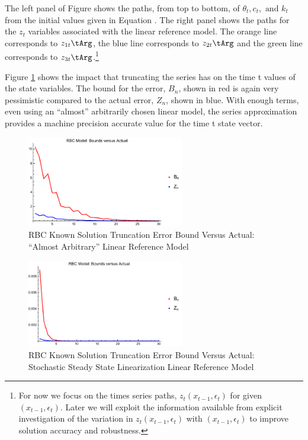 \documentclass[12pt]{article}
\begin{document}
The left panel of Figure  shows the paths, from top to bottom, of $\theta_t, c_t, \text{ and } k_t$ from the initial values given in Equation .  The right panel shows the paths for the $z_t$ variables associated with the linear reference model. The orange line corresponds to $z_{1t}\tArg$,
the blue line corresponds to $z_{2t}\tArg$ and the green line corresponds to $z_{3t}\tArg$.\footnote{For now we focus on the times series paths, $z_t(x_{t-1},\epsilon_t)$ for given $(x_{t-1},\epsilon_t)$.  Later we will exploit the information available from explicit investigation of the variation in
  $z_t(x_{t-1},\epsilon_t)$ with $(x_{t-1},\epsilon_t)$ to improve solution accuracy and robustness.}

Figure \ref{rbcTrunc} shows the impact that truncating the series has 
on the time t values of the state variables.   The bound for the error, $B_n$, shown in red 
 is again very pessimistic compared to the actual error, $Z_n$, shown in blue.
With enough terms, even using an ``almost'' arbitrarily chosen linear model,  the series approximation provides a machine precision accurate value for the time t state vector.  

\begin{figure}
  \centering
\includegraphics[width=2.7in]{simpArbBoundsVActual.pdf}  
  \caption{RBC Known Solution Truncation Error Bound Versus Actual: ``Almost Arbitrary'' Linear Reference Model}
  \label{rbcTrunc}
\end{figure}
\begin{figure}
  \centering
\includegraphics[width=2.7in]{simpBoundsVActual.pdf}  
  \caption{RBC Known Solution Truncation Error Bound Versus Actual: Stochastic Steady State Linearization Linear Reference Model}
  \label{rbcTruncSimp}
\end{figure}
\end{document}
